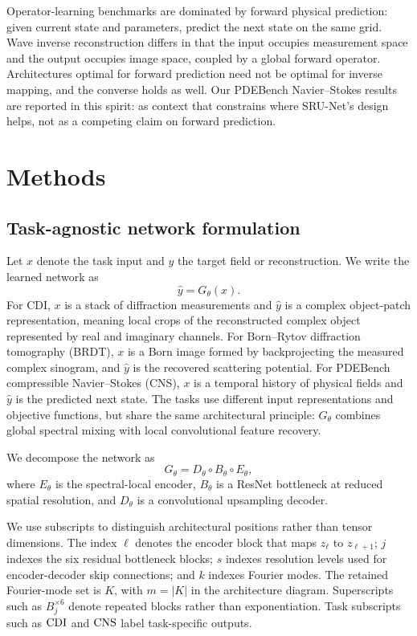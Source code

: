 \documentclass[11pt]{article}
\begin{document}
Operator-learning benchmarks are dominated by forward physical prediction:
given current state and parameters, predict the next state on the same grid.
Wave inverse reconstruction differs in that the input occupies measurement
space and the output occupies image space, coupled by a global forward
operator. Architectures optimal for forward prediction need not be optimal for
inverse mapping, and the converse holds as well. Our PDEBench Navier--Stokes
results are reported in this spirit: as context that constrains where
SRU-Net's design helps, not as a competing claim on forward prediction.

\section{Methods}

\subsection{Task-agnostic network formulation}

Let $x$ denote the task input and $y$ the target field or reconstruction. We
write the learned network as
\begin{equation}
  \hat{y} = G_{\theta}(x).
\end{equation}
For CDI, $x$ is a stack of diffraction measurements and $\hat{y}$ is a complex
object-patch representation, meaning local crops of the reconstructed complex
object represented by real and imaginary channels. For Born--Rytov diffraction
tomography (BRDT), $x$ is a Born image formed by backprojecting the measured
complex sinogram, and $\hat{y}$ is the recovered scattering potential. For
PDEBench compressible
Navier--Stokes (CNS), $x$ is a temporal history of physical fields and
$\hat{y}$ is the predicted next state. The tasks use
different input representations and objective functions, but share the same
architectural principle:
$G_{\theta}$ combines global spectral mixing with local convolutional feature
recovery.

We decompose the network as
\begin{equation}
  G_{\theta} = D_{\theta} \circ B_{\theta} \circ E_{\theta},
\end{equation}
where $E_{\theta}$ is the spectral-local encoder, $B_{\theta}$ is a ResNet
bottleneck at reduced spatial resolution, and $D_{\theta}$ is a convolutional
upsampling decoder.

We use subscripts to distinguish architectural positions rather than tensor
dimensions. The index $\ell$ denotes the encoder block that maps
$z_{\ell}$ to $z_{\ell+1}$; $j$ indexes the six residual bottleneck blocks;
$s$ indexes resolution levels used for encoder-decoder skip connections; and
$k$ indexes Fourier modes. The retained Fourier-mode set is $K$, with
$m=|K|$ in the architecture diagram. Superscripts such as $B_j^{\times 6}$
denote repeated blocks rather than exponentiation. Task subscripts such as
${\rm CDI}$ and ${\rm CNS}$ label task-specific outputs.
\end{document}
